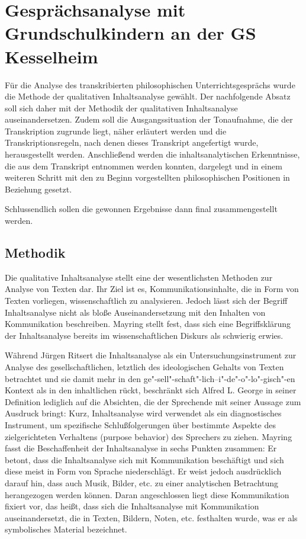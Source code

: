 \section{Gesprächsanalyse mit Grundschulkindern an der GS Kesselheim}

Für die Analyse des transkribierten philosophischen Unterrichtsgesprächs wurde die Methode der qualitativen Inhaltsanalyse gewählt. 
Der nachfolgende Absatz soll sich daher mit der Methodik der qualitativen Inhaltsanalyse auseinandersetzen. 
Zudem soll die Ausgangssituation der Tonaufnahme, die der Transkription zugrunde liegt, näher erläutert werden und die Transkriptionsregeln, nach denen dieses Transkript angefertigt wurde, herausgestellt werden. 
Anschließend werden die inhaltsanalytischen Erkenntnisse, die aus dem Transkript entnommen werden konnten, dargelegt und in einem weiteren Schritt mit den zu Beginn vorgestellten philosophischen Positionen in Beziehung gesetzt.

Schlussendlich sollen die gewonnen Ergebnisse dann final zusammengestellt werden.


\subsection{ Methodik}

Die qualitative Inhaltsanalyse stellt eine der wesentlichsten Methoden zur Analyse von Texten dar. 
Ihr Ziel ist es, \glqq Kommunikationsinhalte, die in Form von Texten vorliegen, wissenschaftlich zu analysieren.\grqq{} \cite[S.\,20]{WK07}
Jedoch lässt sich der Begriff \glqq Inhaltsanalyse\grqq{} nicht als bloße Auseinandersetzung mit den Inhalten von Kommunikation beschreiben. 
Mayring stellt fest, dass sich eine Begriffsklärung der Inhaltsanalyse bereits im wissenschaftlichen Diskurs als schwierig erwies. 

Während Jürgen Ritsert die Inhaltsanalyse als \glqq ein Untersuchungsinstrument zur Analyse des \glqq gesellschaftlichen\grqq{}, letztlich des \glqq ideologischen Gehalts\grqq{} von Texten\grqq{} \cite[S.\,11]{JR07} betrachtet und sie damit mehr in den ge"-sell"-schaft"-lich--i"-de"-o"-lo"-gisch"-en Kontext als in den inhaltlichen rückt, beschränkt sich Alfred L. George in seiner Definition lediglich auf die Absichten, die der Sprechende mit seiner Aussage zum Ausdruck bringt: 
\glqq Kurz, Inhaltsanalyse wird verwendet als ein diagnostisches Instrument, um spezifische Schlußfolgerungen über bestimmte Aspekte des zielgerichteten Verhaltens (purpose behavior) des Sprechers zu ziehen.\grqq{} \cite[S.\,11]{AG07}
Mayring fasst die Beschaffenheit der Inhaltsanalyse in sechs Punkten zusammen: 
Er betont, dass die Inhaltsanalyse sich mit Kommunikation beschäftigt und sich diese meist in Form von Sprache niederschlägt. 
Er weist jedoch ausdrücklich darauf hin, dass auch Musik, Bilder, etc. zu einer analytischen Betrachtung herangezogen werden können. 
Daran angeschlossen liegt diese Kommunikation fixiert vor, das heißt, dass sich die Inhaltsanalyse mit Kommunikation auseinandersetzt, die in Texten, Bildern, Noten, etc. festhalten wurde, was er als symbolisches Material bezeichnet\cite[S.\,12]{PM07}.

